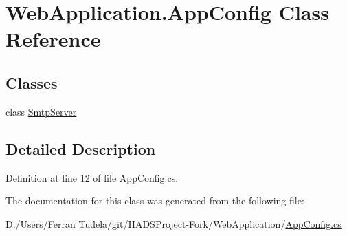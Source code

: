 \hypertarget{classWebApplication_1_1AppConfig}{}\section{Web\+Application.\+App\+Config Class Reference}
\label{classWebApplication_1_1AppConfig}
\subsection*{Classes}
\begin{DoxyCompactItemize}
\item 
class \mbox{\hyperlink{classWebApplication_1_1AppConfig_1_1SmtpServer}{Smtp\+Server}}
\end{DoxyCompactItemize}


\subsection{Detailed Description}


Definition at line 12 of file App\+Config.\+cs.



The documentation for this class was generated from the following file\+:\begin{DoxyCompactItemize}
\item 
D\+:/\+Users/\+Ferran Tudela/git/\+H\+A\+D\+S\+Project-\/\+Fork/\+Web\+Application/\mbox{\hyperlink{AppConfig_8cs}{App\+Config.\+cs}}\end{DoxyCompactItemize}
